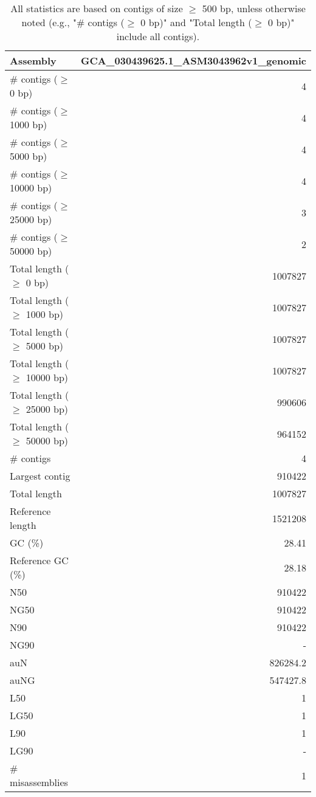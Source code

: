 \documentclass[12pt,a4paper]{article}
\begin{document}
\begin{table}[ht]
\begin{center}
\caption{All statistics are based on contigs of size $\geq$ 500 bp, unless otherwise noted (e.g., "\# contigs ($\geq$ 0 bp)" and "Total length ($\geq$ 0 bp)" include all contigs).}
\begin{tabular}{|l*{1}{|r}|}
\hline
Assembly & GCA\_030439625.1\_ASM3043962v1\_genomic \\ \hline
\# contigs ($\geq$ 0 bp) & 4 \\ \hline
\# contigs ($\geq$ 1000 bp) & 4 \\ \hline
\# contigs ($\geq$ 5000 bp) & 4 \\ \hline
\# contigs ($\geq$ 10000 bp) & 4 \\ \hline
\# contigs ($\geq$ 25000 bp) & 3 \\ \hline
\# contigs ($\geq$ 50000 bp) & 2 \\ \hline
Total length ($\geq$ 0 bp) & 1007827 \\ \hline
Total length ($\geq$ 1000 bp) & 1007827 \\ \hline
Total length ($\geq$ 5000 bp) & 1007827 \\ \hline
Total length ($\geq$ 10000 bp) & 1007827 \\ \hline
Total length ($\geq$ 25000 bp) & 990606 \\ \hline
Total length ($\geq$ 50000 bp) & 964152 \\ \hline
\# contigs & 4 \\ \hline
Largest contig & 910422 \\ \hline
Total length & 1007827 \\ \hline
Reference length & 1521208 \\ \hline
GC (\%) & 28.41 \\ \hline
Reference GC (\%) & 28.18 \\ \hline
N50 & 910422 \\ \hline
NG50 & 910422 \\ \hline
N90 & 910422 \\ \hline
NG90 & - \\ \hline
auN & 826284.2 \\ \hline
auNG & 547427.8 \\ \hline
L50 & 1 \\ \hline
LG50 & 1 \\ \hline
L90 & 1 \\ \hline
LG90 & - \\ \hline
\# misassemblies & 1 \\ \hline

\end{tabular}
\end{center}
\end{table}
\end{document}
